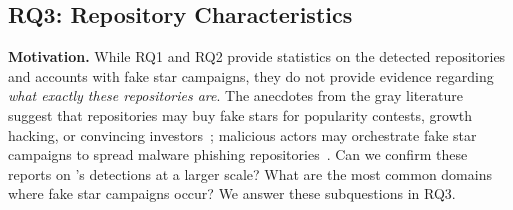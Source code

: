\subsection{RQ3: Repository Characteristics}
\label{sec:rq3}

\textbf{Motivation.}
While RQ1 and RQ2 provide statistics on the detected repositories and accounts with fake star campaigns, they do not provide evidence regarding \emph{what exactly these repositories are}.
The anecdotes from the gray literature
suggest that repositories may buy fake stars for popularity contests, growth hacking, or convincing investors~\cite{startup-stars, wired-news}; malicious actors may orchestrate fake star campaigns to spread malware phishing repositories~\cite{stargazer-goblin}.
Can we confirm these reports on \SystemName's detections at a larger scale?
What are the most common domains where fake star campaigns occur?
We answer these subquestions in RQ3.

